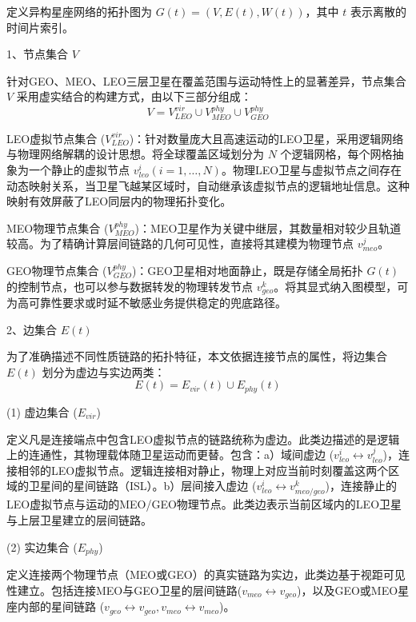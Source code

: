 \documentclass[print, master, vlined]{DissertUESTC}
\begin{document}
    定义异构星座网络的拓扑图为 $G(t) = (V, E(t), W(t))$，其中 $t$ 表示离散的时间片索引。
    
    1、节点集合 $V$
    
    针对GEO、MEO、LEO三层卫星在覆盖范围与运动特性上的显著差异，节点集合 $V$ 采用虚实结合的构建方式，由以下三部分组成：
    \begin{equation}
        V = V_{LEO}^{vir} \cup V_{MEO}^{phy} \cup V_{GEO}^{phy}
    \end{equation}
    
    LEO虚拟节点集合 ($V_{LEO}^{vir}$)：针对数量庞大且高速运动的LEO卫星，采用逻辑网络与物理网络解耦的设计思想。将全球覆盖区域划分为 $N$ 个逻辑网格，每个网格抽象为一个静止的虚拟节点 $v_{leo}^i (i=1, \dots, N)$。物理LEO卫星与虚拟节点之间存在动态映射关系，当卫星飞越某区域时，自动继承该虚拟节点的逻辑地址信息。这种映射有效屏蔽了LEO同层内的物理拓扑变化。
    
    MEO物理节点集合 ($V_{MEO}^{phy}$)：MEO卫星作为关键中继层，其数量相对较少且轨道较高。为了精确计算层间链路的几何可见性，直接将其建模为物理节点 $v_{meo}^j$。
    
    GEO物理节点集合 ($V_{GEO}^{phy}$)：GEO卫星相对地面静止，既是存储全局拓扑 $G(t)$ 的控制节点，也可以参与数据转发的物理转发节点 $v_{geo}^k$。将其显式纳入图模型，可为高可靠性要求或时延不敏感业务提供稳定的兜底路径。

    2、边集合 $E(t)$
    
    为了准确描述不同性质链路的拓扑特征，本文依据连接节点的属性，将边集合 $E(t)$ 划分为虚边与实边两类：
    \begin{equation}
        E(t) = E_{vir}(t) \cup E_{phy}(t)
    \end{equation}
    
    (1) 虚边集合 ($E_{vir}$)
    
    定义凡是连接端点中包含LEO虚拟节点的链路统称为虚边。此类边描述的是逻辑上的连通性，其物理载体随卫星运动而更替。包含：a）域间虚边 ($v_{leo}^i \leftrightarrow v_{leo}^j$)，连接相邻的LEO虚拟节点。逻辑连接相对静止，物理上对应当前时刻覆盖这两个区域的卫星间的星间链路（ISL）。b）层间接入虚边 ($v_{leo}^i \leftrightarrow v_{meo/geo}^k$)，连接静止的LEO虚拟节点与运动的MEO/GEO物理节点。此类边表示当前区域内的LEO卫星与上层卫星建立的层间链路。
    
    (2) 实边集合 ($E_{phy}$)
    
    定义连接两个物理节点（MEO或GEO）的真实链路为实边，此类边基于视距可见性建立。包括连接MEO与GEO卫星的层间链路($v_{meo} \leftrightarrow v_{geo}$)，以及GEO或MEO星座内部的星间链路 ($v_{geo} \leftrightarrow v_{geo}, v_{meo} \leftrightarrow v_{meo}$)。
    
\end{document}
